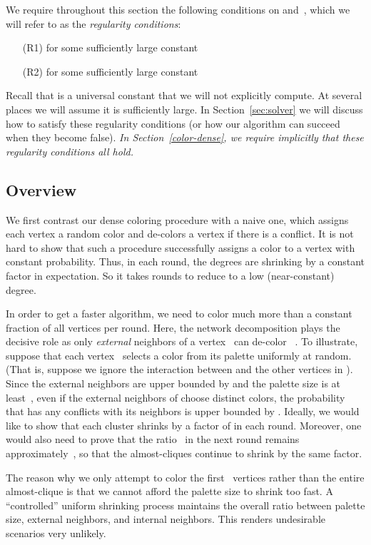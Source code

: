 \documentclass[11pt]{amsart}
\begin{document}
We require throughout this section the following conditions on  and~, which we will refer to as the \emph{regularity conditions}:
\begin{enumerate}
\item[(R1)]  for some sufficiently large constant~
\item[(R2)]  for some sufficiently large constant~
\end{enumerate}
Recall that  is a universal constant that we will not explicitly compute. At several places we will assume it is sufficiently large. In Section~\ref{sec:solver} we will discuss how to satisfy these regularity conditions (or how our algorithm can succeed when they become false). \emph{In Section~\ref{color-dense}, we require implicitly that these regularity conditions all hold.} 

\subsection{Overview}
We first contrast our dense coloring procedure with a naive one, which assigns each vertex a random color and de-colors a vertex if there is a conflict. It is not hard to show that such a procedure successfully assigns a color to a vertex with constant probability. Thus, in each round, the degrees are shrinking by a constant factor in expectation. So it takes  rounds to reduce to a low (near-constant) degree.

In order to get a faster algorithm, we need to color much more than a constant fraction of all vertices per round. Here, the network decomposition plays the decisive role as only \emph{external} neighbors of a vertex~ can de-color ~. To illustrate, suppose that each vertex~ selects a color from its palette uniformly at random. (That is, suppose we ignore the interaction between  and the other vertices in ). Since the external neighbors are upper bounded by  and the palette size is at least~, even if the external neighbors of  choose distinct colors, the probability that  has any conflicts with its neighbors is upper bounded by . Ideally, we would like to show that each cluster shrinks by a factor of  in each round. Moreover, one would also need to prove that the ratio~ in the next round remains approximately~, so that the almost-cliques continue to shrink by the same factor.

The reason why we only attempt to color the first~ vertices rather than the entire almost-clique is that we cannot afford the palette size to shrink too fast. A ``controlled'' uniform shrinking process maintains the overall ratio between palette size, external neighbors, and internal neighbors. This renders undesirable  scenarios very unlikely.
\end{document}
